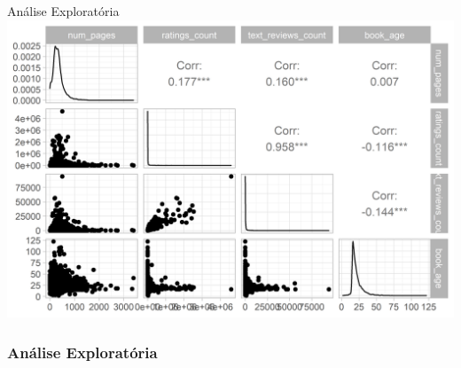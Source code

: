 \documentclass[
  9 pt,
  ignorenonframetext,
]{beamer}
\begin{document}
\begin{frame}{Análise Exploratória}
\includegraphics{apresentacao_files/figure-beamer/unnamed-chunk-5-1.png}
\end{frame}

\hypertarget{anuxe1lise-exploratuxf3ria-2}{%
\subsubsection{Análise
Exploratória}\label{anuxe1lise-exploratuxf3ria-2}}
\end{document}
